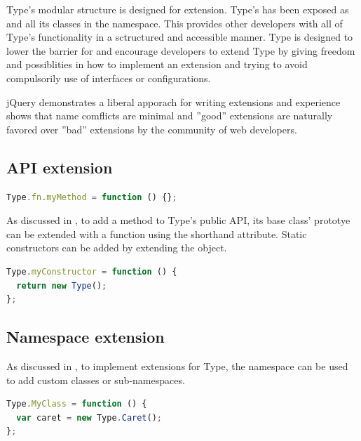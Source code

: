 Type's modular structure is designed for extension. Type's  has been exposed as  and all its classes in the  namespace. This provides other developers with all of Type's functionality in a sctructured and accessible manner. Type is designed to lower the barrier for and encourage developers to extend Type by giving freedom and possiblities in how to implement an extension and trying to avoid compulsorily use of interfaces or configurations.

jQuery demonstrates a liberal apporach for writing extensions and experience shows that name comflicts are minimal and ''good'' extensions are naturally favored over ''bad'' extensions by the community of web developers.

\subsection{API extension}

\begin{lstlisting}[language=JavaScript, caption=Example Type API extension, label=lst:api_extension_example]
Type.fn.myMethod = function () {};
\end{lstlisting}

As discussed in , to add a method to Type's public API, its base class' prototye can be extended with a function using the  shorthand attribute. Static constructors can be added by extending the   object.

\begin{lstlisting}[language=JavaScript, caption=Example custom static constructor, label=lst:example_static_constructor_extension]
Type.myConstructor = function () {
  return new Type();
};
\end{lstlisting}

\subsection{Namespace extension}

As discussed in , to implement extensions for Type, the  namespace can be used to add custom classes or sub-namespaces.

\begin{lstlisting}[language=JavaScript, caption=Example Type namespace extension and usage of a built-in class., label=lst:namespace_extension_example]
Type.MyClass = function () {
  var caret = new Type.Caret();
};
\end{lstlisting}


